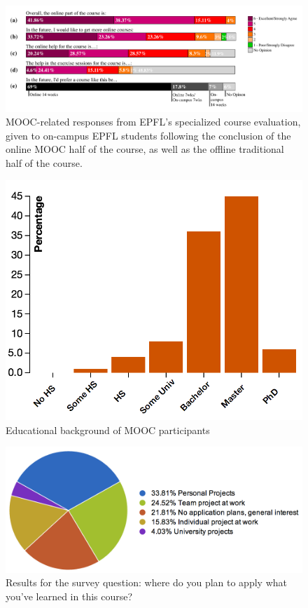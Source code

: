\documentclass{sig-alternate}
\begin{document}
\begin{figure}[ht!]
  \centering
  \includegraphics[width=\textwidth]{plots/epfl-course-eval.pdf}
  \caption{MOOC-related responses from EPFL's specialized course evaluation, given to on-campus EPFL students following the conclusion of the online MOOC half of the course, as well as the offline traditional half of the course.}
  \label{fig:epfl-course-eval}
\end{figure}

\begin{figure}[ht!]
  \centering
  \includegraphics[width=0.85\columnwidth]{plots/education.png}
  \caption{Educational background of MOOC participants}
  \label{fig:education}
\end{figure}

\begin{figure}[ht!]
  \centering
  \includegraphics[width=\columnwidth]{plots/where-apply.png}
  \caption{Results for the survey question: where do you plan to apply what you've learned in this course?}
  \label{fig:where-apply}
\end{figure}
\end{document}
